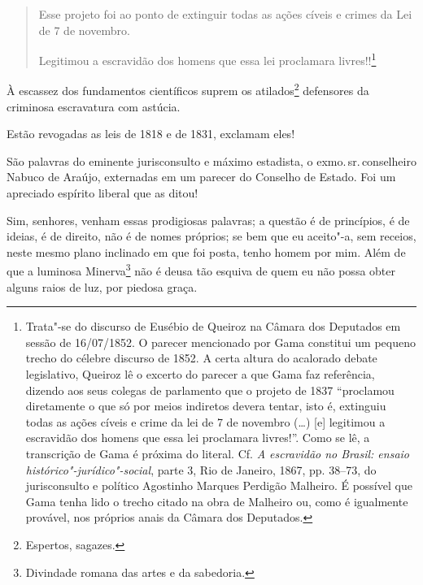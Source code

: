 \begin{quote}
Esse projeto foi ao ponto de extinguir todas as ações cíveis e crimes
da Lei de 7 de novembro.

Legitimou a escravidão dos homens que essa lei proclamara
livres!!\footnote{Trata"-se do discurso de Eusébio de Queiroz na
  Câmara dos Deputados em sessão de 16/07/1852. O parecer mencionado por
  Gama constitui um pequeno trecho do célebre discurso de 1852. A certa
  altura do acalorado debate legislativo, Queiroz lê o excerto do
  parecer a que Gama faz referência, dizendo aos seus colegas de
  parlamento que o projeto de 1837 ``proclamou diretamente o que só por
  meios indiretos devera tentar, isto é, extinguiu todas as ações cíveis
  e crime da lei de 7 de novembro (\ldots{}) {[}e{]} legitimou a escravidão
  dos homens que essa lei proclamara livres!''. Como se lê, a transcrição
  de Gama é próxima do literal. Cf. \emph{A escravidão no Brasil: ensaio
  histórico"-jurídico"-social}, parte 3, Rio de Janeiro, 1867, pp. 38--73,
  do jurisconsulto e político Agostinho Marques Perdigão Malheiro. É
 possível que Gama tenha lido o trecho citado na obra de
  Malheiro ou, como é igualmente provável, nos próprios anais da Câmara
  dos Deputados.}
\end{quote}

À escassez dos fundamentos científicos suprem os atilados\footnote{
  Espertos, sagazes.} defensores da criminosa escravatura com astúcia.

Estão revogadas as leis de 1818 e de 1831, exclamam eles!

São palavras do eminente jurisconsulto e máximo estadista, o exmo.\,sr.\,conselheiro Nabuco de Araújo, externadas em um parecer do Conselho de
Estado. Foi um apreciado espírito liberal que as ditou!

Sim, senhores, venham essas prodigiosas palavras; a questão é de
princípios, é de ideias, é de direito, não é de nomes próprios; se bem
que eu aceito"-a, sem receios, neste mesmo plano inclinado em que foi
posta, tenho homem por mim. Além de que a luminosa Minerva\footnote{
  Divindade romana das artes e da sabedoria.} não é deusa tão esquiva de
quem eu não possa obter alguns raios de luz, por piedosa graça.

